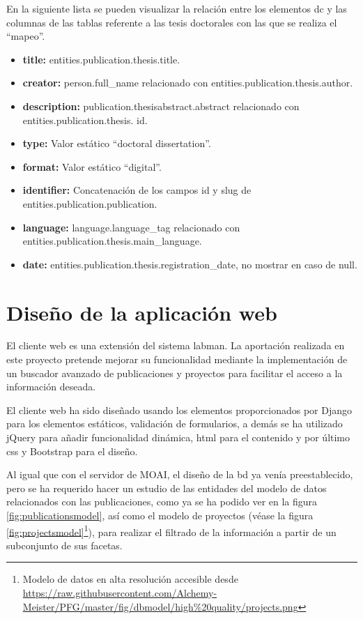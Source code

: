 En la siguiente lista se pueden visualizar la relación entre los elementos \acrshort{dc} y las columnas de las tablas referente a las tesis doctorales con las que se realiza el ``mapeo''.

\begin{itemize}
	\item \textbf{title:} entities.publication.thesis.title.
	\item \textbf{creator:} person.full\_name relacionado con entities.publication.thesis.author.
	\item \textbf{description:} publication.thesisabstract.abstract relacionado con entities.publication.thesis. id.
	\item \textbf{type:} Valor estático ``doctoral dissertation''.
	\item \textbf{format:} Valor estático ``digital''.
	\item \textbf{identifier:} Concatenación de los campos id y slug de entities.publication.publication.
	\item \textbf{language:} language.language\_tag relacionado con entities.publication.thesis.main\_language.
	\item \textbf{date:} entities.publication.thesis.registration\_date, no mostrar en caso de null.
\end{itemize}

\section{Diseño de la aplicación web}

El cliente web es una extensión del sistema \acrshort{labman}. La aportación realizada en este proyecto pretende mejorar su funcionalidad mediante la implementación de un buscador avanzado de publicaciones y proyectos para facilitar el acceso a la información deseada.

El cliente web ha sido diseñado usando los elementos proporcionados por Django para los elementos estáticos, validación de formularios, a demás se ha utilizado jQuery para añadir funcionalidad dinámica, \acrshort{html} para el contenido y por último \acrshort{css} y Bootstrap para el diseño.

Al igual que con el servidor de MOAI, el diseño de la \acrshort{bd} ya venía preestablecido, pero se ha requerido hacer un estudio de las entidades del modelo de datos relacionados con las publicaciones, como ya se ha podido ver en la figura \ref{fig:publicationsmodel}, así como el modelo de proyectos (véase la figura \ref{fig:projectsmodel}\footnote{Modelo de datos en alta resolución accesible desde \url{https://raw.githubusercontent.com/Alchemy-Meister/PFG/master/fig/dbmodel/high\%20quality/projects.png}}), para realizar el filtrado de la información a partir de un subconjunto de sus facetas.

